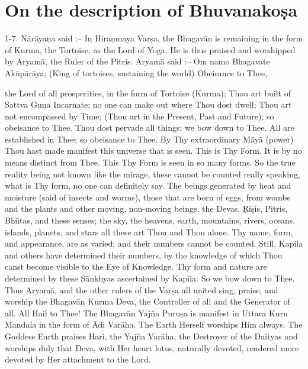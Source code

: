 \chapter{On the description of Bhuvanako\d{s}a}

1-7. N\=ar\=aya\d{n}a said :-- In Hira\d{n}maya Var\d{s}a, the Bhagav\=an is remaining in the form of Kurma, the Tortoise, as the Lord of Yoga. He is thus praised and worshipped by Aryam\=a, the Ruler of the Pitris. Aryam\=a said :-- Om namo Bhagavate Ak\=up\=ar\=aya; (King of tortoises, sustaining the world) Obeisance to Thee,

the Lord of all prosperities, in the form of Tortoise (Kurma); Thou art built of Sattva Gu\d{n}a Incarnate; no one can make out where Thou dost dwell; Thou art not encompassed by Time; (Thou art in the Present, Past and Future); so obeisance to Thee. Thou dost pervade all things; we bow down to Thee. All are established in Thee; so obeisance to Thee. By Thy extraordinary M\=ay\=a (power) Thou hast made manifest this universe that is seen. This is Thy Form. It is by no means distinct from Thee. This Thy Form is seen in so many forms. So the true reality being not known like the mirage, these cannot be counted really speaking, what is Thy form, no one can definitely say. The beings generated by heat and moisture (said of insects and worms), those that are born of eggs, from wombs and the plants and other moving, non-moving beings, the Devas, \d{R}i\d{s}is, Pitris, Bh\=utas, and these senses; the sky, the heavens, earth, mountains, rivers, oceans, islands, planets, and stars all these art Thou and Thou alone. Thy name, form, and appearance, are as varied; and their numbers cannot be counted. Still, Kapila and others have determined their numbers, by the knowledge of which Thou canst become visible to the Eye of Knowledge. Thy form and nature are determined by these S\=ankhyas ascertained by Kapila. So we bow down to Thee. Thus Aryam\=a, and the other rulers of the Var\d{s}a all united sing, praise, and worship the Bhagav\=an Kurma Deva, the Controller of all and the Generator of all. All Hail to Thee! The Bhagav\=an Yaj\~na Puru\d{s}a is manifest in Uttara Kuru Mandala in the form of \=Adi Var\=aha. The Earth Herself worships Him always. The Goddess Earth praises Hari, the Yaj\~na Var\=aha, the Destroyer of the Daityas and worships duly that Deva, with Her heart lotus, naturally devoted, rendered more devoted by Her attachment to the Lord.

